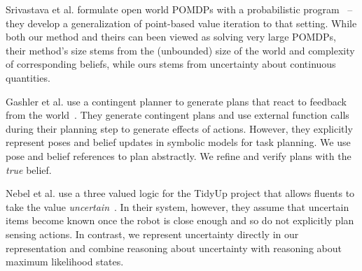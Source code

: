 Srivastava et al. formulate open world POMDPs with a probabilistic
program~\cite{srivastava2014first} -- they develop a generalization of
point-based value iteration to that setting. While both our method and
theirs can been viewed as solving very large POMDPs, their method's size stems from
the (unbounded) size of the world and complexity of corresponding
beliefs, while ours stems from uncertainty about continuous quantities.


Gashler et al. use a contingent planner to generate plans that react
to feedback from the world~\cite{gaschler2013kvp}. They generate
contingent plans and use external function calls during their planning
step to generate effects of actions. However, they explicitly
represent poses and belief updates in symbolic models for task
planning. We use pose and belief references to plan abstractly. We
refine and verify plans with the \emph{true} belief.

Nebel et al. use a three valued logic for the TidyUp project that
allows fluents to take the value
\emph{uncertain}~\cite{nebel13aaaiirs}. In their system, however, they
assume that uncertain items become known once the robot is close
enough and so do not explicitly plan sensing actions. In contrast, we
represent uncertainty directly in our representation and combine
reasoning about uncertainty with reasoning about maximum likelihood
states.


